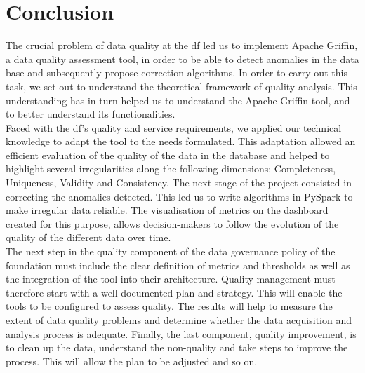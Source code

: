 \cleardoublepage
{}
{}

\vspace*{0.5cm}
\section*{\centering \Huge  Conclusion}
\titlerule[2.0pt]
\vspace{1cm}
The crucial problem of data quality at the \acrlong{df} led us to implement Apache Griffin, a data quality assessment tool, in order to be able to detect anomalies in the data base and subsequently propose correction algorithms. In order to carry out this task, we set out to understand the theoretical framework of quality analysis. This understanding has in turn helped us to understand the Apache Griffin tool, and to better understand its functionalities. \\

Faced with the \acrshort{df}'s quality and service requirements, we applied our technical knowledge to adapt the tool to the needs formulated. This adaptation allowed an efficient evaluation of the quality of the data in the database and helped to highlight several irregularities along the following dimensions: Completeness, Uniqueness, Validity and Consistency. The next stage of the project consisted in correcting the anomalies detected. This led us to write algorithms in PySpark to make irregular data reliable. The visualisation of metrics on the dashboard created for this purpose, allows decision-makers to follow the evolution of the quality of the different data over time. \\

The next step in the quality component of the data governance policy of the foundation must include the clear definition of metrics and thresholds as well as the integration of the tool into their architecture. Quality management must therefore start with a well-documented plan and strategy. This will enable the tools to be configured to assess quality. The results will help to measure the extent of data quality problems and determine whether the data acquisition and analysis process is adequate. Finally, the last component, quality improvement, is to clean up the data, understand the non-quality and take steps to improve the process. This will allow the plan to be adjusted and so on.